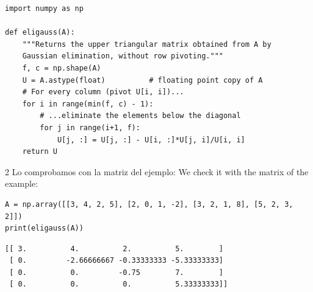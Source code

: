 \begin{verbatim}
import numpy as np

def eligauss(A):
    """Returns the upper triangular matrix obtained from A by
    Gaussian elimination, without row pivoting."""
    f, c = np.shape(A)
    U = A.astype(float)          # floating point copy of A
    # For every column (pivot U[i, i])...
    for i in range(min(f, c) - 1):
        # ...eliminate the elements below the diagonal
        for j in range(i+1, f):
            U[j, :] = U[j, :] - U[i, :]*U[j, i]/U[i, i]
    return U
\end{verbatim}

\begin{paracol}{2}
Lo comprobamos con la matriz del ejemplo:
\switchcolumn
We check it with the matrix of the example:
\end{paracol}
\begin{verbatim}
A = np.array([[3, 4, 2, 5], [2, 0, 1, -2], [3, 2, 1, 8], [5, 2, 3, 2]])
print(eligauss(A))
\end{verbatim}
\begin{verbatim}
[[ 3.          4.          2.          5.        ]
 [ 0.         -2.66666667 -0.33333333 -5.33333333]
 [ 0.          0.         -0.75        7.        ]
 [ 0.          0.          0.          5.33333333]]
\end{verbatim}

